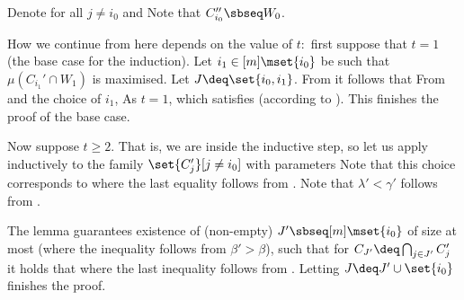 Denote
for all $j\neq i_0$ and
Note that $C_{i_0}'' \sbseq W_0$.

How we continue from here depends on the value of $t$:\ first suppose that $t=1$ (the base case for the induction).
Let $i_1\in[m]\mset{i_0}$ be such that $\mu(C_{i_1}' \cap W_1)$ is maximised.
Let $J \deq \set{i_0, i_1}$.
{}From  it follows that
{}From  and the choice of $i_1$,
As $t=1$,
which satisfies  (according to ).
This finishes the proof of the base case.

Now suppose $t \ge 2$.
That is, we are inside the inductive step, so let us apply  inductively to the family $\set{C_j'}[j\neq i_0]$ with parameters
Note that this choice corresponds to
where the last equality follows from .
Note that $\lambda'<\gamma'$ follows from .

The lemma guarantees existence of (non-empty) $J'\sbseq [m]\mset{i_0}$ of size at most
(where the inequality follows from $\beta' > \beta$), such that for
%
$C_{J'} \deq \bigcap_{j\in J'}C_j'$  %
it holds that
where the last inequality follows from .
Letting $J \deq J' \cup \set{i_0}$ finishes the proof.
\prfend

